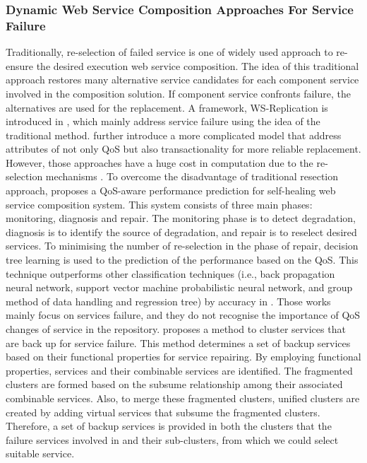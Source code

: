 \subsubsection{Dynamic Web Service Composition Approaches For Service Failure}\label{dynamicService}
Traditionally, re-selection of failed service is one of widely used approach to re-ensure the desired execution web service composition. The idea of this traditional approach restores many alternative service candidates for each component service involved in the composition solution. If component service confronts failure, the alternatives are used for the replacement.  A framework, WS-Replication is introduced in \cite{salas2006ws}, which mainly address service failure using the idea of the traditional method. \cite{yin2010qos} further introduce a more complicated model that address attributes of not only QoS but also transactionality for more reliable replacement. However, those approaches \cite{salas2006ws,yin2010qos} have a huge cost in computation due to the re-selection mechanisms \cite{nasridinov2012qos}. To overcome the disadvantage of traditional resection approach, \cite{nasridinov2012qos} proposes a QoS-aware performance prediction for self-healing web service composition system. This system consists of three main phases: monitoring, diagnosis and repair. The monitoring phase is to detect degradation, diagnosis is to identify the source of degradation, and repair is to reselect desired services. To minimising the number of re-selection in the phase of repair, decision tree learning is used to the prediction of the performance based on the QoS. This technique outperforms other classification techniques (i.e., back propagation neural network, support vector machine probabilistic neural network, and group method of data handling and regression tree) by accuracy in \cite{mohanty2010web}.  Those works mainly focus on services failure, and they do not recognise the importance of  QoS changes of service in the repository. \cite{wagner2016robust} proposes a method to cluster services that are back up for service failure. This method determines a set of backup services based on their functional properties for service repairing. By employing functional properties, services and their combinable services are identified. The fragmented clusters are formed based on the subsume relationship among their associated combinable services. Also, to merge these fragmented clusters, unified clusters are created by adding virtual services that subsume the fragmented clusters. Therefore, a set of backup services is provided in both the clusters that the failure services involved in and their sub-clusters, from which we could select suitable service.


